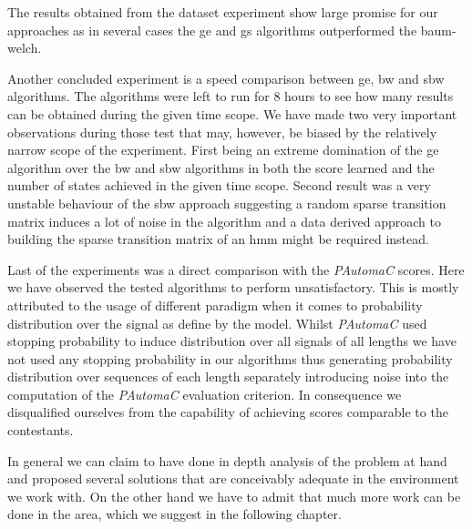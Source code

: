 The results obtained from the dataset experiment show large promise for our approaches as in several cases the \gls{ge} and \gls{gs} algorithms outperformed the \gls{baum-welch}.

Another concluded experiment is a speed comparison between \acrlong{ge}, \acrlong{bw} and \acrlong{sbw} algorithms. The algorithms were left to run for 8 hours to see how many results can be obtained during the given time scope. We have made two very important observations during those test that may, however, be biased by the relatively narrow scope of the experiment. First being an extreme domination of the \gls{ge} algorithm over the \gls{bw} and \gls{sbw} algorithms in both the score learned and the number of states achieved in the given time scope. Second result was a very unstable behaviour of the \gls{sbw} approach suggesting a random sparse transition matrix induces a lot of noise in the algorithm and a data derived approach to building the sparse transition matrix of an \gls{hmm} might be required instead.

Last of the experiments was a direct comparison with the \emph{PAutomaC} scores. Here we have observed the tested algorithms to perform unsatisfactory. This is mostly attributed to the usage of different paradigm when it comes to probability distribution over the signal as define by the model. Whilst \emph{PAutomaC} used stopping probability to induce distribution over all signals of all lengths we have not used any stopping probability in our algorithms thus generating probability distribution over sequences of each length separately introducing noise into the computation of the \emph{PAutomaC} evaluation criterion. In consequence we disqualified ourselves from the capability of achieving scores comparable to the contestants.

In general we can claim to have done in depth analysis of the problem at hand and proposed several solutions that are conceivably adequate in the environment we work with. On the other hand we have to admit that much more work can be done in the area, which we suggest in the following chapter.